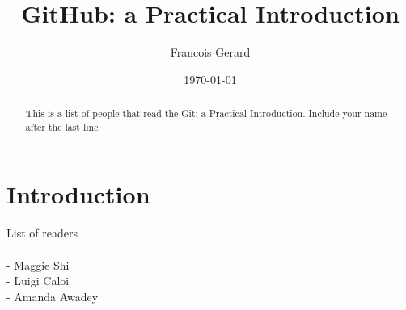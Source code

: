 \documentclass[12pt]{article}
\begin{document}
\title{GitHub: a Practical Introduction} %
\author{Francois Gerard}


\date{\today}  %

\maketitle 

\begin{abstract} 

	This is a list of people that read the Git: a Practical Introduction. Include your name after the last line
	
\end{abstract}

\section{Introduction}
List of readers \\ \\
- Maggie Shi \\
- Luigi Caloi  \\
- Amanda Awadey
	 
\end{document}
